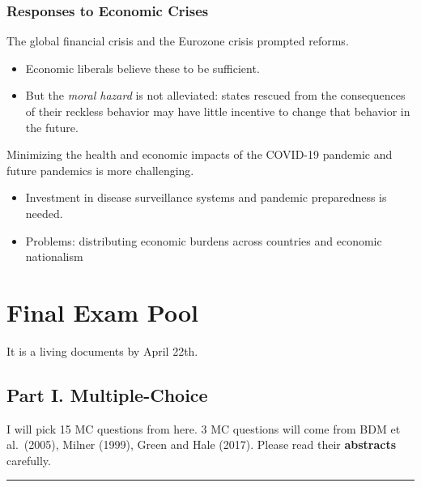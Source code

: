 \documentclass[
]{book}
\begin{document}
\hypertarget{responses-to-economic-crises}{%
\subsection{Responses to Economic Crises}\label{responses-to-economic-crises}}

The global financial crisis and the Eurozone crisis prompted reforms.

\begin{itemize}
\item
  Economic liberals believe these to be sufficient.
\item
  But the \emph{moral hazard} is not alleviated: states rescued from the consequences of their reckless behavior may have little incentive to change that behavior in the future.
\end{itemize}

Minimizing the health and economic impacts of the COVID-19 pandemic and future pandemics is more challenging.

\begin{itemize}
\item
  Investment in disease surveillance systems and pandemic preparedness is needed.
\item
  Problems: distributing economic burdens across countries and economic nationalism
\end{itemize}

\hypertarget{final-exam-pool}{%
\chapter*{Final Exam Pool}\label{final-exam-pool}}

It is a living documents by April 22th.

\hypertarget{part-i.-multiple-choice}{%
\section*{Part I. Multiple-Choice}\label{part-i.-multiple-choice}}

I will pick 15 MC questions from here. 3 MC questions will come from BDM et al.~(2005), Milner (1999), Green and Hale (2017). Please read their \textbf{abstracts} carefully.

\begin{center}\rule{0.5\linewidth}{0.5pt}\end{center}
\end{document}
